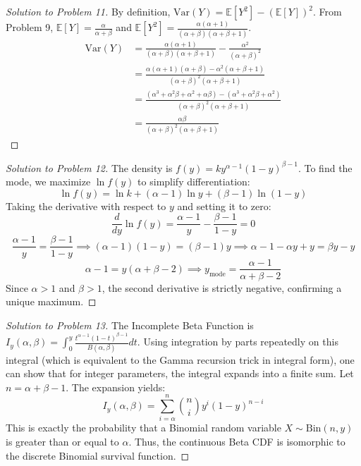 \documentclass[11pt, a4paper]{article}
\theoremstyle{definition}
\theoremstyle{remark}
\newcommand{\E}{\mathbb{E}}
\begin{document}
\begin{proof}[Solution to Problem 11]
By definition, $\text{Var}(Y) = \E[Y^2] - (\E[Y])^2$.
From Problem 9, $\E[Y] = \frac{\alpha}{\alpha+\beta}$ and $\E[Y^2] = \frac{\alpha(\alpha+1)}{(\alpha+\beta)(\alpha+\beta+1)}$.
\begin{align*}
\text{Var}(Y) &= \frac{\alpha(\alpha+1)}{(\alpha+\beta)(\alpha+\beta+1)} - \frac{\alpha^2}{(\alpha+\beta)^2} \\
&= \frac{\alpha(\alpha+1)(\alpha+\beta) - \alpha^2(\alpha+\beta+1)}{(\alpha+\beta)^2(\alpha+\beta+1)} \\
&= \frac{(\alpha^3 + \alpha^2\beta + \alpha^2 + \alpha\beta) - (\alpha^3 + \alpha^2\beta + \alpha^2)}{(\alpha+\beta)^2(\alpha+\beta+1)} \\
&= \frac{\alpha\beta}{(\alpha+\beta)^2(\alpha+\beta+1)}
\end{align*}
\end{proof}

\begin{proof}[Solution to Problem 12]
The density is $f(y) = k y^{\alpha-1}(1-y)^{\beta-1}$. To find the mode, we maximize $\ln f(y)$ to simplify differentiation:
\[
\ln f(y) = \ln k + (\alpha-1)\ln y + (\beta-1)\ln(1-y)
\]
Taking the derivative with respect to $y$ and setting it to zero:
\[
\frac{d}{dy} \ln f(y) = \frac{\alpha-1}{y} - \frac{\beta-1}{1-y} = 0
\]
\[
\frac{\alpha-1}{y} = \frac{\beta-1}{1-y} \implies (\alpha-1)(1-y) = (\beta-1)y \implies \alpha - 1 - \alpha y + y = \beta y - y
\]
\[
\alpha - 1 = y(\alpha + \beta - 2) \implies y_{\text{mode}} = \frac{\alpha-1}{\alpha+\beta-2}
\]
Since $\alpha > 1$ and $\beta > 1$, the second derivative is strictly negative, confirming a unique maximum.
\end{proof}

\begin{proof}[Solution to Problem 13]
The Incomplete Beta Function is $I_y(\alpha, \beta) = \int_0^y \frac{t^{\alpha-1}(1-t)^{\beta-1}}{B(\alpha, \beta)} dt$.
Using integration by parts repeatedly on this integral (which is equivalent to the Gamma recursion trick in integral form), one can show that for integer parameters, the integral expands into a finite sum. Let $n = \alpha + \beta - 1$. The expansion yields:
\[
I_y(\alpha, \beta) = \sum_{i=\alpha}^n \binom{n}{i} y^i (1-y)^{n-i}
\]
This is exactly the probability that a Binomial random variable $X \sim \text{Bin}(n, y)$ is greater than or equal to $\alpha$. Thus, the continuous Beta CDF is isomorphic to the discrete Binomial survival function.
\end{proof}
\end{document}
